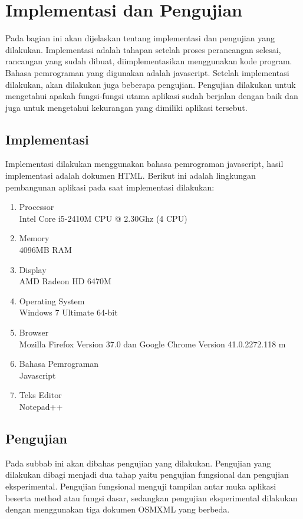 \chapter{Implementasi dan Pengujian}
Pada bagian ini akan dijelaskan tentang implementasi dan pengujian yang
dilakukan. Implementasi adalah tahapan setelah proses perancangan selesai,
rancangan yang sudah dibuat, diimplementasikan menggunakan kode program. Bahasa
pemrograman yang digunakan adalah javascript. Setelah implementasi dilakukan,
akan dilakukan juga beberapa pengujian. Pengujian dilakukan untuk mengetahui
apakah fungsi-fungsi utama aplikasi sudah berjalan dengan baik dan
juga untuk mengetahui kekurangan yang dimiliki aplikasi tersebut.

\section{Implementasi}
Implementasi dilakukan menggunakan bahasa pemrograman javascript, hasil
implementasi adalah dokumen HTML. Berikut ini adalah lingkungan pembangunan
aplikasi pada saat implementasi dilakukan:
\begin{enumerate}
  \item Processor\\
  Intel Core i5-2410M CPU @ 2.30Ghz (4 CPU)
  
  \item Memory\\
  4096MB RAM
  
  \item Display\\
  AMD Radeon HD 6470M
  
  \item Operating System\\
  Windows 7 Ultimate 64-bit
  
  \item Browser\\
  Mozilla Firefox Version 37.0 dan Google Chrome Version 41.0.2272.118 m 
  
  \item Bahasa Pemrograman\\
  Javascript
  
  \item Teks Editor\\
  Notepad++
\end{enumerate}

\section{Pengujian}
Pada subbab ini akan dibahas pengujian yang dilakukan. Pengujian yang dilakukan
dibagi menjadi dua tahap yaitu pengujian fungsional dan pengujian eksperimental.
Pengujian fungsional menguji tampilan antar muka aplikasi beserta method atau
fungsi dasar, sedangkan pengujian eksperimental dilakukan dengan menggunakan
tiga dokumen OSMXML yang berbeda.


